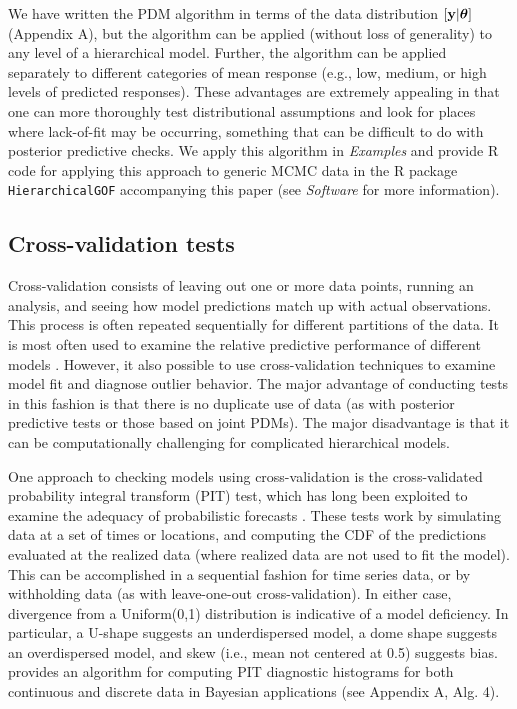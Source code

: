 \documentclass[12pt,english]{article}
\begin{document}
\begin{spacing}{1.9}
We have written the PDM algorithm in terms of the data distribution $[{\bf y} | \boldsymbol{\theta}]$ (Appendix A), but the algorithm can be applied (without loss of generality) to any level of a hierarchical model. Further, the algorithm can be applied separately to different categories of mean response (e.g., low, medium, or high levels of predicted responses). These advantages are extremely appealing in that one can more thoroughly test distributional assumptions and look for places where lack-of-fit may be occurring, something that can be difficult to do with posterior predictive checks.  We apply this algorithm in \textit{Examples} and provide R code for applying this approach to generic MCMC data in the R package \texttt{HierarchicalGOF} accompanying this paper (see \textit{Software} for more information).



\subsection{Cross-validation tests}

Cross-validation consists of leaving out one or more data points, running an analysis, and seeing how model predictions match up with actual observations.  This process is often repeated sequentially for different partitions of the data.  It is most often used to examine the relative predictive performance of different models \citep[i.e., for model selection; see e.g.][]{ArlotCelisse2010}.  However, it also possible to use cross-validation techniques to examine model fit and diagnose outlier behavior.  The major advantage of conducting tests in this fashion is that there is no duplicate use of data (as with posterior predictive tests or those based on joint PDMs).  The major disadvantage is that it can be computationally challenging for complicated hierarchical models.

One approach to checking models using cross-validation is the cross-validated probability integral transform (PIT) test, which has long been exploited to examine the adequacy of probabilistic forecasts \citep[e.g.,][]{Dawid1984,Fruiiwirth1996,GneitingEtAl2007,CzadoEtAl2009}. These tests work by simulating data at a set of times or locations, and computing the CDF of the predictions evaluated at the realized data (where realized data are not used to fit the model).  This can be accomplished in a sequential fashion for time series data, or by withholding data (as with leave-one-out cross-validation).  In either case, divergence from a Uniform(0,1) distribution is indicative of a model deficiency.  In particular, a U-shape suggests an underdispersed model, a dome shape suggests an overdispersed model, and skew (i.e., mean not centered at 0.5) suggests bias.  \citet{Congdon2014} provides an algorithm for computing PIT diagnostic histograms for both continuous and discrete data in Bayesian applications (see Appendix A, Alg. 4).


\end{spacing}
\end{document}
